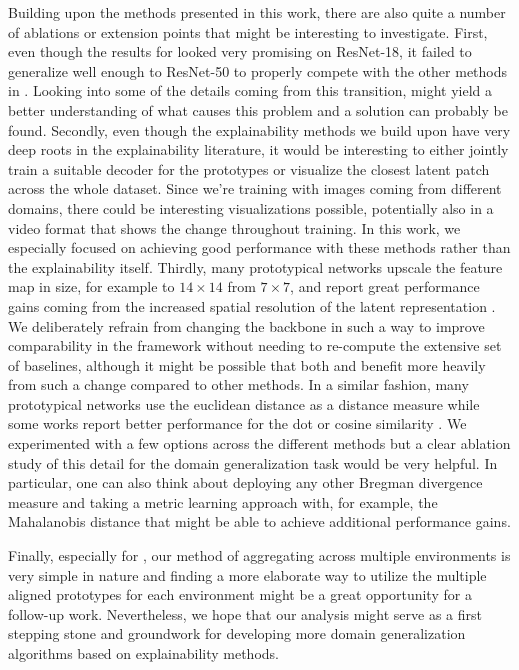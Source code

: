 Building upon the methods presented in this work, there are also quite a number of ablations or extension points that might be interesting to investigate. First, even though the results for \prodrop looked very promising on ResNet-18, it failed to generalize well enough to ResNet-50 to properly compete with the other methods in \domainbed. Looking into some of the details coming from this transition, might yield a better understanding of what causes this problem and a solution can probably be found. Secondly, even though the explainability methods we build upon have very deep roots in the explainability literature, it would be interesting to either jointly train a suitable decoder for the prototypes or visualize the closest latent patch across the whole dataset. Since we're training with images coming from different domains, there could be interesting visualizations possible, potentially also in a video format that shows the change throughout training. In this work, we especially focused on achieving good performance with these methods rather than the explainability itself. Thirdly, many prototypical networks upscale the feature map in size, for example to $14 \times 14$ from $7 \times 7$, and report great performance gains coming from the increased spatial resolution of the latent representation \citep{DoerschGZ20}. We deliberately refrain from changing the backbone in such a way to improve comparability in the \domainbed framework without needing to re-compute the extensive set of baselines, although it might be possible that both \prodrop and \dtransformers benefit more heavily from such a change compared to other methods. In a similar fashion, many prototypical networks use the euclidean distance as a distance measure while some works report better performance for the dot or cosine similarity \citep{XuXWSA20}. We experimented with a few options across the different methods but a clear ablation study of this detail for the domain generalization task would be very helpful. In particular, one can also think about deploying any other Bregman divergence measure and taking a metric learning approach with, for example, the Mahalanobis distance \citep{BanerjeeMDG04} that might be able to achieve additional performance gains. 

Finally, especially for \dtransformers, our method of aggregating across multiple environments is very simple in nature and finding a more elaborate way to utilize the multiple aligned prototypes for each environment might be a great opportunity for a follow-up work. Nevertheless, we hope that our analysis might serve as a first stepping stone and groundwork for developing more domain generalization algorithms based on explainability methods. 
